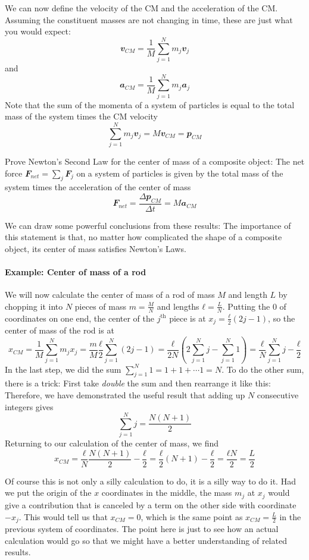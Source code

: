 We can now define the velocity of the CM and the acceleration of the CM. Assuming the constituent masses are not changing in time, these are just what you would expect:
$$
𝒗_{CM} = \frac1M \sum_{j=1}^N m_j 𝒗_j 
$$
and 
$$
𝒂_{CM} = \frac1M \sum_{j=1}^N m_j 𝒂_j 
$$
Note that the sum of the momenta of a system of particles is equal to the total mass of the system times the CM velocity
$$
\sum_{j=1}^N m_j 𝒗_j = M 𝒗_{CM} =𝒑_{CM}
$$
\begin{exercise}
Prove Newton's Second Law for the center of mass of a composite object: The net force $𝑭_{net} = \sum_j 𝑭_j$ on a system of particles is given by the total mass of the system times the acceleration of the center of mass
$$
𝑭_{net} = \frac{Δ𝒑_{CM}}{Δt} = M 𝒂_{CM} 
$$
\end{exercise} 
We can draw some powerful conclusions from these results:
The importance of this statement is that, no matter how complicated the shape of a composite object, its center of mass satisfies Newton's Laws.

\paragraph{Example: Center of mass of a rod}
We will now calculate the center of mass of a rod of mass $M$ and length $L$ by chopping it into $N$ pieces of mass $m=\frac MN$ and lengths $ℓ = \frac LN$. Putting the $0$ of coordinates on one end, the center of the $j^{\textrm{th}}$ piece is at $x_j = \frac ℓ2 (2j-1)$, so the center of mass of the rod is at
$$
x_{CM} = \frac1M \sum_{j=1}^N m_j x_j 
	= \frac mM  \frac ℓ2 \sum_{j=1}^N  (2j-1)
	= \frac ℓ{2N}  \left(2\sum_{j=1}^N j-  \sum_{j=1}^N  1\right)
	= \frac ℓN \sum_{j=1}^N j- \frac ℓ2
$$
In the last step, we did the sum $\sum_{j=1}^N  1 = 1+1+\cdots 1 = N$. To do the other sum, there is a trick: First take {\em double} the sum and then rearrange it like this:
Therefore, we have demonstrated the useful result that adding up $N$ consecutive integers gives 
$$
\sum_{j=1}^N j = \frac {N(N+1)}2
$$
Returning to our calculation of the center of mass, we find 
$$
x_{CM} 
	= \frac ℓ{N} \frac{N(N+1)}2 - \frac ℓ2 
	= \frac ℓ2  (N+1) - \frac ℓ2 
	= \frac {ℓN}{2} 
	= \frac L2
$$

Of course this is not only a silly calculation to do, it is a silly way to do it. Had we put the origin of the $x$ coordinates in the middle, the mass $m_j$ at $x_j$ would give a contribution that is canceled by a term on the other side with coordinate $-x_j$. This would tell us that $x_{CM}=0$, which is the same point as $x_{CM} = \frac L2$ in the previous system of coordinates. 
The point here is just to see how an actual calculation would go so that we might have a better understanding of related results. 

